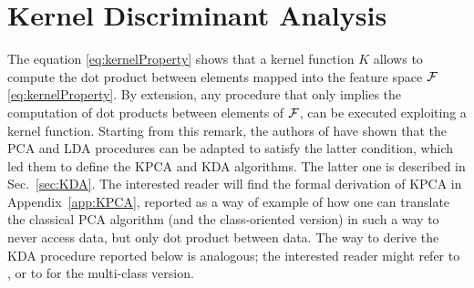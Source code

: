 
\section{Kernel Discriminant Analysis}
The equation \eqref{eq:kernelProperty} shows that a kernel function $K$ allows to compute the dot product between elements mapped into the feature space $\mathcal{F}$ \eqref{eq:kernelProperty}. By extension, any procedure that only implies the computation of dot products between elements of $\mathcal{F}$, can be executed exploiting a kernel function. Starting from this remark, the authors of  \cite{scholkopf1998nonlinear,scholkopf1999fisher} have shown that the PCA and LDA procedures can be adapted to satisfy the latter condition, which led them to define the KPCA and KDA algorithms. The latter one is described in Sec.~\ref{sec:KDA}. The interested reader will find the formal derivation of KPCA in Appendix~\ref{app:KPCA}, reported as a way of example of how one can translate the classical PCA algorithm (and the class-oriented version) in such a way to never access data, but only dot product between data. The way to derive the KDA procedure reported below is analogous; the interested reader might refer to \cite{scholkopf1999fisher}, or to \cite{baudat2000generalized} for the multi-class version.

